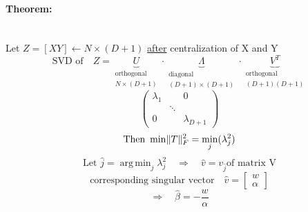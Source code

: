 \documentclass[11pt]{article}
\DeclareMathOperator*{\argmin}{arg\,min}
\DeclarePairedDelimiter\norm{\lVert}{\rVert}
\begin{document}
\begin{itemize}
      \paragraph{Theorem: }\\
      Let $Z=[X Y] \leftarrow N \times (D+1)$ \underline{after} centralization of
      X and Y
      \begin{equation*}
        \text{SVD of} \quad Z = \underbrace{U}_{\substack{\text{orthogonal} \\ N\times (D+1)}}
        \cdot \underbrace{\Lambda}_{\substack{\text{diagonal} \\ (D+1)\times(D+1)}} \cdot
        \underbrace{V^T}_{\substack{\text{orthogonal} \\ (D+1)(D+1)}}
      \end{equation*}
      \begin{equation*}
        \left(
        \begin{array}{ccc}
          \lambda_1 & & 0 \\
          & \ddots & \\
          0 & & \lambda_{D+1}
        \end{array}
        \right)
      \end{equation*}
      \begin{equation*}
        \text{Then } \min \norm{T}_F^2 = \min_j(\lambda_j^2)
      \end{equation*}
      \begin{equation*}
        \text{Let }  \hat{j} = \argmin_j \lambda_j^2 \quad \Rightarrow \quad \hat{v} =
        v_{\hat{j}} \text{of matrix V}
      \end{equation*}
      \begin{equation*}
        \text{corresponding singular vector} \quad \hat{v} = \left[
        \begin{array}{c}
          w \\
          \alpha
        \end{array}
        \right]
      \end{equation*}
      \begin{equation*}
        \Rightarrow \quad \boxed{\hat{\beta} = -\frac{w}{\alpha}}
      \end{equation*}

\end{itemize}
\end{document}
